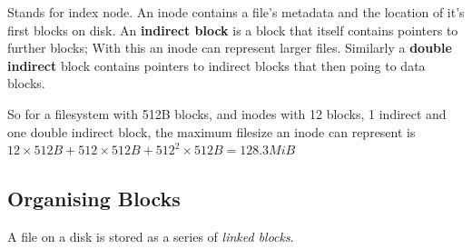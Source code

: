 \documentclass[a4]{article}
\begin{document}
Stands for index node. An inode contains a file's metadata and the location of it's first blocks on disk.
An \textbf{indirect block} is a block that itself contains pointers to further blocks; With this an inode can represent larger files. Similarly a \textbf{double indirect} block contains pointers to indirect blocks that then poing to data blocks.

So for a filesystem with 512B blocks, and inodes with 12 blocks, 1 indirect and one double indirect block, the maximum filesize an inode can represent is ${12 \times 512B + 512 \times 512B + 512^2 \times 512B = 128.3 MiB}$

\subsection{Organising Blocks}

A file on a disk is stored as a series of \textit{linked blocks}. 
\end{document}
